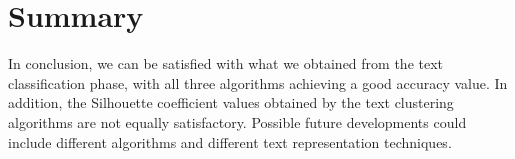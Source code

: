 \documentclass[fleqn,10pt]{SelfArx} %
\begin{document}
\section{Summary}
In conclusion, we can be satisfied with what we obtained from the text classification phase, with all three algorithms achieving a good accuracy value. In addition, the Silhouette coefficient values obtained by the text clustering algorithms are not equally satisfactory. Possible future developments could include different algorithms and different text representation techniques.


\nocite{*}
\printbibliography

\end{document}
